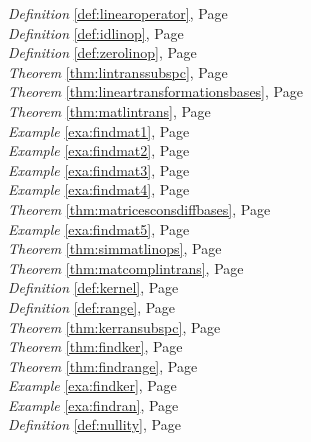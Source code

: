 \begin{multicols}{3}
\begin{center}
      \textit{Definition} \ref{def:linearoperator}, Page \pageref{def:linearoperator} \\
      \textit{Definition} \ref{def:idlinop}, Page \pageref{def:idlinop} \\
      \textit{Definition} \ref{def:zerolinop}, Page \pageref{def:zerolinop} \\
      \textit{Theorem} \ref{thm:lintranssubspc}, Page \pageref{thm:lintranssubspc} \\
      \textit{Theorem} \ref{thm:lineartransformationsbases}, Page \pageref{thm:lineartransformationsbases} \\
      \textit{Theorem} \ref{thm:matlintrans}, Page \pageref{thm:matlintrans} \\
      \textit{Example} \ref{exa:findmat1}, Page \pageref{exa:findmat1} \\
      \textit{Example} \ref{exa:findmat2}, Page \pageref{exa:findmat2} \\
      \textit{Example} \ref{exa:findmat3}, Page \pageref{exa:findmat3} \\
      \textit{Example} \ref{exa:findmat4}, Page \pageref{exa:findmat4} \\
      \textit{Theorem} \ref{thm:matricesconsdiffbases}, Page \pageref{thm:matricesconsdiffbases} \\
      \textit{Example} \ref{exa:findmat5}, Page \pageref{exa:findmat5} \\
      \textit{Theorem} \ref{thm:simmatlinops}, Page \pageref{thm:simmatlinops} \\
      \textit{Theorem} \ref{thm:matcomplintrans}, Page \pageref{thm:matcomplintrans} \\
      \textit{Definition} \ref{def:kernel}, Page \pageref{def:kernel} \\
      \textit{Definition} \ref{def:range}, Page \pageref{def:range} \\
      \textit{Theorem} \ref{thm:kerransubspc}, Page \pageref{thm:kerransubspc} \\
      \textit{Theorem} \ref{thm:findker}, Page \pageref{thm:findker} \\
      \textit{Theorem} \ref{thm:findrange}, Page \pageref{thm:findrange} \\
      \textit{Example} \ref{exa:findker}, Page \pageref{exa:findker} \\
      \textit{Example} \ref{exa:findran}, Page \pageref{exa:findran} \\
      \textit{Definition} \ref{def:nullity}, Page \pageref{def:nullity} \\

\end{center}
\end{multicols}
